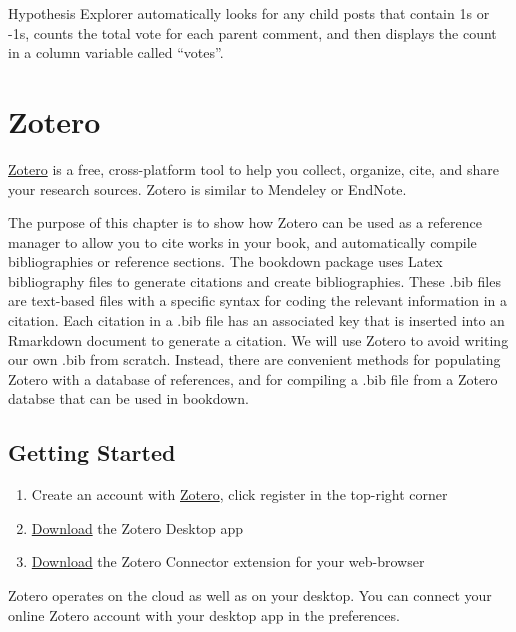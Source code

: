 \documentclass[
]{book}
\providecommand{\tightlist}{%
  \setlength{\itemsep}{0pt}\setlength{\parskip}{0pt}}
\begin{document}
Hypothesis Explorer automatically looks for any child posts that contain 1s or -1s, counts the total vote for each parent comment, and then displays the count in a column variable called ``votes''.

\hypertarget{zotero}{%
\chapter{Zotero}\label{zotero}}

\href{https://www.zotero.org}{Zotero} is a free, cross-platform tool to help you collect, organize, cite, and share your research sources. Zotero is similar to Mendeley or EndNote.

The purpose of this chapter is to show how Zotero can be used as a reference manager to allow you to cite works in your book, and automatically compile bibliographies or reference sections. The bookdown package uses Latex bibliography files to generate citations and create bibliographies. These .bib files are text-based files with a specific syntax for coding the relevant information in a citation. Each citation in a .bib file has an associated key that is inserted into an Rmarkdown document to generate a citation. We will use Zotero to avoid writing our own .bib from scratch. Instead, there are convenient methods for populating Zotero with a database of references, and for compiling a .bib file from a Zotero databse that can be used in bookdown.

\hypertarget{getting-started}{%
\section{Getting Started}\label{getting-started}}

\begin{enumerate}
\def\labelenumi{\arabic{enumi}.}
\tightlist
\item
  Create an account with \href{https://www.zotero.org}{Zotero}, click register in the top-right corner
\item
  \href{https://www.zotero.org/download/}{Download} the Zotero Desktop app
\item
  \href{https://www.zotero.org/download/}{Download} the Zotero Connector extension for your web-browser
\end{enumerate}

Zotero operates on the cloud as well as on your desktop. You can connect your online Zotero account with your desktop app in the preferences.
\end{document}
